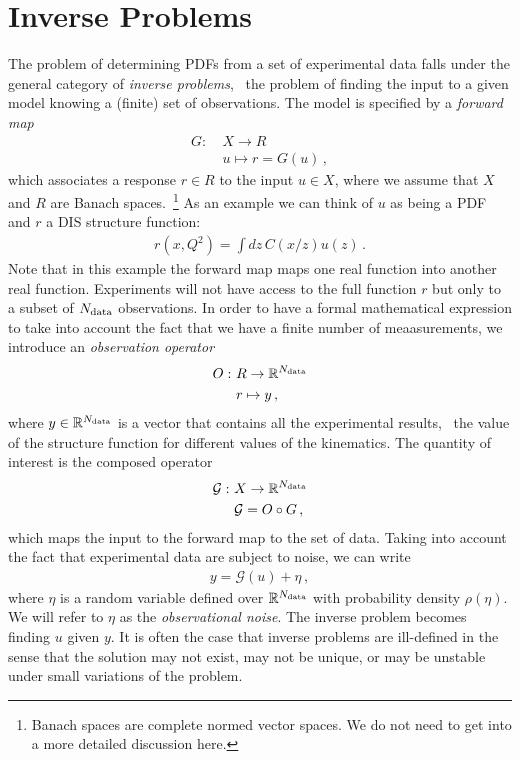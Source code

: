 
\section{Inverse Problems}
\label{sec:inverse-problems}

The problem of determining PDFs from a set of experimental data falls
under the general category of {\em inverse problems}, \ie\ the problem
of finding the input to a given model knowing a (finite) set of
observations. The model is specified by a {\em forward map}
\begin{align}
  \label{eq:ForwardMap}
  G : ~& X \to R \nonumber \\
      & u \mapsto r=G(u) \, ,
\end{align}
which associates a response $r \in R$ to the input $u \in X$, where we
assume that $X$ and $R$ are Banach spaces.~\footnote{Banach spaces are
  complete normed vector spaces. We do not need to get into a more
  detailed discussion here.} As an example we can think of $u$ as
being a PDF and $r$ a DIS structure function:
\begin{align}
  \label{eq:DISExample}
  r(x,Q^2) = \int dz\, C(x/z) u(z)\, .
\end{align}
Note that in this example the forward map maps one real function into
another real function. Experiments will not have access to the full
function $r$ but only to a subset of $N_{\rm data}$ observations. In order
to have a formal mathematical expression to take into account the fact
that we have a finite number of meaasurements, we introduce an {\em
  observation operator}
\begin{align}
  O : ~& R \to \mathbb{R}^{N_{\rm data}} \nonumber \\
       & r \mapsto y \, ,
\end{align}
where $y \in \mathbb{R}^{N_{\rm data}}$ is a vector that contains all the
experimental results, \eg\ the value of the structure function for
different values of the kinematics. The quantity of interest is the
composed operator
\begin{align}
  \mathcal{G} : ~& X \to \mathbb{R}^{N_{\rm data}} \nonumber \\
                 & \mathcal{G} = O \circ G\, ,
\end{align}
which maps the input to the forward map to the set of data. Taking
into account the fact that experimental data are subject to noise, we
can write
\begin{align}
  \label{eq:NoisyInverseProblem}
  y = \mathcal{G}(u) + \eta\, ,
\end{align}
where $\eta$ is a random variable defined over $\mathbb{R}^{N_{\rm data}}$
with probability density $\rho(\eta)$. We will refer to $\eta$ as the
{\em observational noise}. The inverse problem becomes finding $u$
given $y$. It is often the case that inverse problems are ill-defined
in the sense that the solution may not exist, may not be unique, or
may be unstable under small variations of the problem. 

